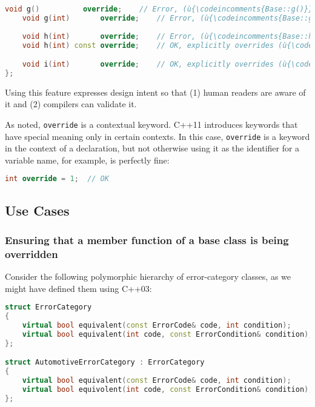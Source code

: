 \begin{lstlisting}[language=C++]
    void g()          override;    // Error, (ù{\codeincomments{Base::g()}}ù) not found                         
    void g(int)       override;    // Error, (ù{\codeincomments{Base::g()}}ù) is not virtual.                   
                                                                                     
    void h(int)       override;    // Error, (ù{\codeincomments{Base::h(int)}}ù) not found
    void h(int) const override;    // OK, explicitly overrides (ù{\codeincomments{Base::h(int)}}ù)                 

    void i(int)       override;    // OK, explicitly overrides (ù{\codeincomments{Base::i(int)}}ù)  
};
\end{lstlisting}
    
\noindent Using this feature expresses design intent so that (1) human readers
are aware of it and (2) compilers can validate it. 

As noted, \lstinline!override! is a contextual keyword. C++11 introduces keywords that have special meaning only in certain contexts.   In this case, \lstinline!override! is a keyword in the context of a declaration, but not otherwise using it as the identifier for a variable name, for example, is perfectly fine:

\begin{lstlisting}[language=C++]
int override = 1;  // OK
\end{lstlisting}

\subsection[Use Cases]{Use Cases}\label{use-cases}

\subsubsection[Ensuring that a member function of a base class is being overridden]{Ensuring that a member function of a base class is being overridden}\label{ensuring-that-a-member-function-of-a-base-class-is-being-overridden}

Consider the following polymorphic hierarchy of error-category classes, as we might have defined them using C++03:

\begin{lstlisting}[language=C++]
struct ErrorCategory
{
    virtual bool equivalent(const ErrorCode& code, int condition);
    virtual bool equivalent(int code, const ErrorCondition& condition);
};

struct AutomotiveErrorCategory : ErrorCategory
{
    virtual bool equivalent(const ErrorCode& code, int condition);
    virtual bool equivolent(int code, const ErrorCondition& condition);
};
\end{lstlisting}
    
